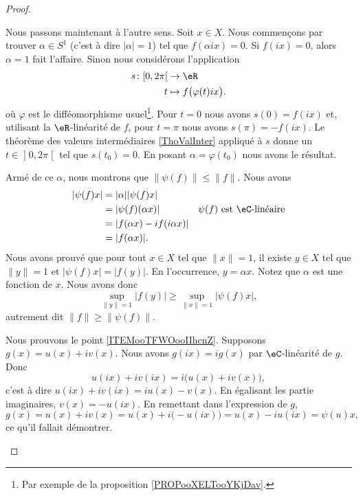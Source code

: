 \begin{proof}
\begin{subproof}
		Nous passons maintenant à l'autre sens. Soit \( x\in X\). Nous commençons par trouver \( \alpha\in S^1\) (c'est à dire \( | \alpha |=1\)) tel que \( f(\alpha ix)=0\). Si \( f(ix)=0\), alors \( \alpha=1\) fait l'affaire. Sinon nous considérons l'application
		\begin{equation}
			\begin{aligned}
				s\colon \mathopen[ 0,2\pi\mathclose[ & \to \eR                            \\
				t                                    & \mapsto f\big( \varphi(t)ix \big).
			\end{aligned}
		\end{equation}
		où \( \varphi\) est le difféomorphisme usuel\footnote{Par exemple de la proposition \ref{PROPooXELTooYKjDav}.}. Pour \( t=0\) nous avons \( s(0)=f(ix)\) et, utilisant la \( \eR\)-linéarité de \( f\), pour \( t=\pi\) nous avons \( s(\pi)=-f(ix)\). Le théorème des valeurs intermédiaires \ref{ThoValInter} appliqué à \( s\) donne un \( t\in \mathopen] 0,2\pi\mathclose[\) tel que \( s(t_0)=0\). En posant \( \alpha=\varphi(t_0)\) nous avons le résultat.

		Armé de ce \( \alpha\), nous montrons que \( \| \psi(f) \|\leq \| f \|\). Nous avons
		\begin{subequations}
			\begin{align}
				| \psi(f)x | & =| \alpha || \psi(f)x |                                                    \\
				             & =| \psi(f)(\alpha x) |         & \text{\( \psi(f)\) est \( \eC\)-linéaire} \\
				             & =| f(\alpha x)-if(i\alpha x) |                                             \\
				             & =| f(\alpha x) |.
			\end{align}
		\end{subequations}
		Nous avons prouvé que pour tout \( x\in X\) tel que \( \| x \|=1\), il existe \( y\in X\) tel que \( \| y \|=1\) et \( | \psi(f)x |=| f(y) |\). En l'occurrence, \( y=\alpha x\). Notez que \( \alpha\) est une fonction de \( x\). Nous avons donc
		\begin{equation}
			\sup_{\| y \|=1}| f(y) |\geq \sup_{\| x \|=1}| \psi(f)x |,
		\end{equation}
		autrement dit \( \| f \|\geq \| \psi(f) \|\).

		\spitem[Décomposition]
		Nous prouvons le point \ref{ITEMooTFWOooIIhcnZ}. Supposons \( g(x)=u(x)+iv(x)\). Nous avons \( g(ix)=ig(x)\) par \( \eC\)-linéarité de \( g\). Donc
		\begin{equation}
			u(ix)+iv(ix)=i\big( u(x)+iv(x) \big),
		\end{equation}
		c'est à dire \( u(ix)+iv(ix)=iu(x)-v(x)\). En égalisant les partie imaginaires, \( v(x)=-u(ix)\). En remettant dans l'expression de \( g\),
		\begin{equation}
			g(x)=u(x)+iv(x)=u(x)+i\big( -u(ix) \big)=u(x)-iu(ix)=\psi(u)x,
		\end{equation}
		ce qu'il fallait démontrer.
	\end{subproof}
\end{proof}

